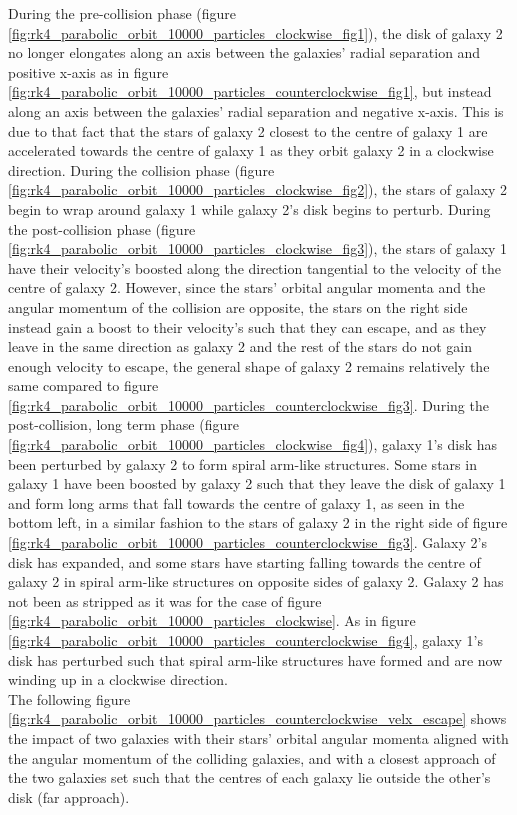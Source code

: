 \documentclass[10pt,letterpaper]{article}
\begin{document}
During the pre-collision phase (figure \ref{fig:rk4_parabolic_orbit_10000_particles_clockwise_fig1}), the disk of galaxy 2 no longer elongates along an axis between the galaxies' radial separation and positive x-axis as in figure \ref{fig:rk4_parabolic_orbit_10000_particles_counterclockwise_fig1}, but instead along an axis between the galaxies' radial separation and negative x-axis. This is due to that fact that the stars of galaxy 2 closest to the centre of galaxy 1 are accelerated towards the centre of galaxy 1 as they orbit galaxy 2 in a clockwise direction. During the collision phase (figure \ref{fig:rk4_parabolic_orbit_10000_particles_clockwise_fig2}), the stars of galaxy 2 begin to wrap around galaxy 1 while galaxy 2's disk begins to perturb. During the post-collision phase (figure \ref{fig:rk4_parabolic_orbit_10000_particles_clockwise_fig3}), the stars of galaxy 1 have their velocity's boosted along the direction tangential to the velocity of the centre of galaxy 2. However, since the stars' orbital angular momenta and the angular momentum of the collision are opposite, the stars on the right side instead gain a boost to their velocity's such that they can escape, and as they leave in the same direction as galaxy 2 and the rest of the stars do not gain enough velocity to escape, the general shape of galaxy 2 remains relatively the same compared to figure \ref{fig:rk4_parabolic_orbit_10000_particles_counterclockwise_fig3}.  During the post-collision, long term phase (figure \ref{fig:rk4_parabolic_orbit_10000_particles_clockwise_fig4}), galaxy 1's disk has been perturbed by galaxy 2 to form spiral arm-like structures. Some stars in galaxy 1 have been boosted by galaxy 2 such that they leave the disk of galaxy 1 and form long arms that fall towards the centre of galaxy 1, as seen in the bottom left, in a similar fashion to the stars of galaxy 2 in the right side of figure \ref{fig:rk4_parabolic_orbit_10000_particles_counterclockwise_fig3}. Galaxy 2's disk has expanded, and some stars have starting falling towards the centre of galaxy 2 in spiral arm-like structures on opposite sides of galaxy 2. Galaxy 2 has not been as stripped as it was for the case of figure \ref{fig:rk4_parabolic_orbit_10000_particles_clockwise}. As in figure \ref{fig:rk4_parabolic_orbit_10000_particles_counterclockwise_fig4}, galaxy 1's disk has perturbed such that spiral arm-like structures have formed and are now winding up in a clockwise direction.\\

The following figure \ref{fig:rk4_parabolic_orbit_10000_particles_counterclockwise_velx_escape} shows the impact of two galaxies with their stars' orbital angular momenta aligned with the angular momentum of the colliding galaxies, and with a closest approach of the two galaxies set such that the centres of each galaxy lie outside the other's disk (far approach).\\
\end{document}
